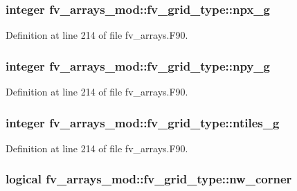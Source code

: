 \subsubsection[{npx\-\_\-g}]{\setlength{\rightskip}{0pt plus 5cm}integer fv\-\_\-arrays\-\_\-mod\-::fv\-\_\-grid\-\_\-type\-::npx\-\_\-g}\label{structfv__arrays__mod_1_1fv__grid__type_a3ac366c0cf8c63dcbbd3a43eec0f0c35}


Definition at line 214 of file fv\-\_\-arrays.\-F90.

\subsubsection[{npy\-\_\-g}]{\setlength{\rightskip}{0pt plus 5cm}integer fv\-\_\-arrays\-\_\-mod\-::fv\-\_\-grid\-\_\-type\-::npy\-\_\-g}\label{structfv__arrays__mod_1_1fv__grid__type_ae56168963555f3c32a62a270549c7a56}


Definition at line 214 of file fv\-\_\-arrays.\-F90.

\subsubsection[{ntiles\-\_\-g}]{\setlength{\rightskip}{0pt plus 5cm}integer fv\-\_\-arrays\-\_\-mod\-::fv\-\_\-grid\-\_\-type\-::ntiles\-\_\-g}\label{structfv__arrays__mod_1_1fv__grid__type_a8d3c5fd98c0347c22e1491e22d2aca0c}


Definition at line 214 of file fv\-\_\-arrays.\-F90.

\subsubsection[{nw\-\_\-corner}]{\setlength{\rightskip}{0pt plus 5cm}logical fv\-\_\-arrays\-\_\-mod\-::fv\-\_\-grid\-\_\-type\-::nw\-\_\-corner}\label{structfv__arrays__mod_1_1fv__grid__type_a645d242712aa83d73d79ca632c8d8d82}


